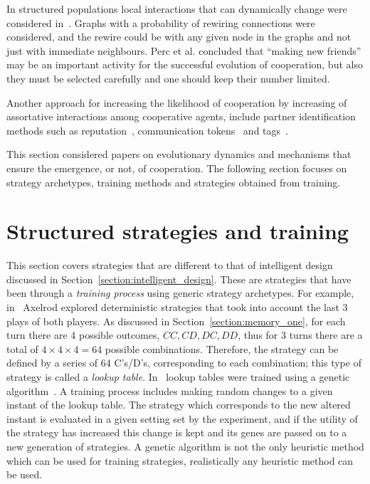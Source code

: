 In structured populations local interactions that can dynamically change were
considered in~\cite{Perc2011}. Graphs with a probability of rewiring 
connections were considered, and the rewire could be with any given node in the
graphs and not just with immediate neighbours. Perc et al. concluded that
``making new friends'' may be an important activity for the successful evolution
of cooperation, but also they must be selected carefully and one should keep
their number limited.

Another approach for increasing the likelihood of cooperation by increasing of
assortative interactions among cooperative agents, include partner identification
methods such as reputation~\cite{Janssen2006, Nowak1998, Suzuki2005},
communication tokens~\cite{Miller2002} and tags~\cite{Choi2006, Hales2000,
Miller2002, Riolo2001}.

This section considered papers on evolutionary dynamics and mechanisms that ensure
the emergence, or not, of cooperation. The following section focuses on strategy
archetypes, training methods and strategies obtained from training.

\section{Structured strategies and training}
\label{section:structured_strategies}

This section covers strategies that are different to that of intelligent design discussed
in Section~\ref{section:intelligent_design}. These are strategies that have
been through a \textit{training process} using generic strategy archetypes. For example,
in~\cite{Axelrod1987} Axelrod explored deterministic strategies that
took into account the last 3 plays of both players. As discussed in
Section~\ref{section:memory_one}, for each turn there are 4 possible outcomes,
\(CC, CD, DC, DD\), thus for 3 turns there are a total of
\(4\times4\times4=64\) possible combinations. Therefore, the strategy can be
defined by a series of 64 C's/D's, corresponding to each combination; this type
of strategy is called a \textit{lookup table}. In~\cite{Axelrod1987} lookup tables were trained using a
genetic algorithm~\cite{Koza1997}. A training process includes making random changes to
a given instant of the lookup table. The strategy which corresponds to the new altered
instant is evaluated in a given setting set by the experiment, and if the
utility of the strategy has increased this change is kept and its genes are passed 
on to a new generation of strategies.
A genetic algorithm is not the only heuristic method which can be used for
training strategies, realistically any heuristic method can be used.

